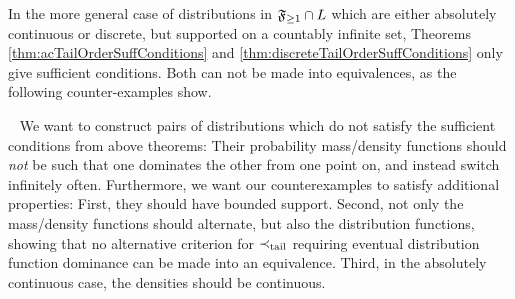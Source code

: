 \documentclass[a4paper]{scrreprt}
\begin{document}
    In the more general case of distributions in $\mathfrak{F}_{\geq 1} \cap L$ which are either absolutely continuous or discrete, but supported on a countably infinite set, Theorems \ref{thm:acTailOrderSuffConditions} and \ref{thm:discreteTailOrderSuffConditions} only give sufficient conditions. Both can not be made into equivalences, as the following counter-examples show.
    \begin{ex}~
        \label{ex:tailOrderSufficientConditionsCounterexamples}
        We want to construct pairs of distributions which do not satisfy the sufficient conditions from above theorems:
        Their probability mass/density functions should \emph{not} be such that one dominates the other from one point on, and instead switch infinitely often.
        Furthermore, we want our counterexamples to satisfy additional properties: 
        First, they should have bounded support. 
        Second, not only the mass/density functions should alternate, but also the distribution functions, showing that no alternative criterion for $\prec_{\text{tail}}$ requiring eventual distribution function dominance can be made into an equivalence.
        Third, in the absolutely continuous case, the densities should be continuous.      
    

\end{ex}
\end{document}
